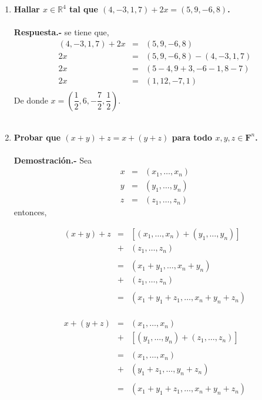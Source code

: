 \begin{multicols}{2}
\begin{enumerate}
     \item \textbf{ \boldmath Hallar $x\in \mathbb{R}^4$ tal que $(4,-3,1,7)+2x=(5,9,-6,8)$.}\\\\
	 \textbf{Respuesta.-}\; se tiene que,
	 $$\begin{array}{rcl}
	     (4,-3,1,7)+2x&=&(5,9,-6,8)\\
			  2x&=&(5,9,-6,8)-(4,-3,1,7)\\
			    2x&=&(5-4,9+3,-6-1,8-7)\\
			    2x&=&(1,12,-7,1)\\
	 \end{array}$$
	 De donde $x=\left(\dfrac{1}{2},6,-\dfrac{7}{2},\dfrac{1}{2}\right).$\\\\

     \item \textbf{\boldmath Probar que $(x+y)+z=x+(y+z)$ para todo $x,y,z\in \mathbf{F}^n$.}\\\\
	 \textbf{Demostración.-}\; Sea 
	 $$\begin{array}{rcl}
	     x&=&(x_1,\ldots,x_n)\\ 
	     y&=&(y_1,\ldots,y_n)\\
	     z&=&(z_1,\ldots,z_n)
	 \end{array}$$ 
	     entonces,

	 $$\begin{array}{rcl}
	     (x+y)+z&=&\left[(x_1,\ldots,x_n)+(y_1,\ldots,y_n)\right]\\
		    &+&(z_1,\ldots,z_n)\\\\
		    &=&(x_1+y_1,\ldots,x_n+y_n)\\
		    &+&(z_1,\ldots ,z_n)\\\\
		    &=&(x_1+y_1+z_1,\ldots,x_n+y_n+z_n)\\
	 \end{array}$$

	 $$\begin{array}{rcl}
	     x+(y+z)&=&(x_1,\ldots,x_n)\\
		    &+&\left[(y_1,\ldots,y_n)+(z_1,\ldots,z_n)\right]\\\\
		    &=&(x_1,\ldots,x_n)\\
		    &+&(y_1 + z_1,\ldots ,y_n + z_n)\\\\
		    &=&(x_1+y_1+z_1,\ldots,x_n+y_n+z_n)\\
	 \end{array}$$


\end{enumerate}
\end{multicols}
